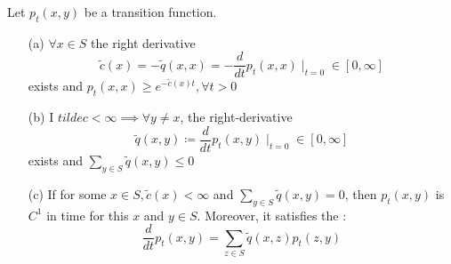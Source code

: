\begin{theorem}\label{thm:1.8}
    Let \(p_t(x,y)\) be a transition function. \begin{enumerate}
        \item[(a)]\(\forall x\in S\) the right derivative \[\tilde{c}(x)=-\tilde{q}(x,x)=-\frac{d}{dt}p_t(x,x)\mid_{t=0}\in[0,\infty]\]
        exists and \(p_t(x,x)\geq e^{-\tilde{c}(x)t},\forall t>0\)
        \item[(b)] I \(tilde{c}<\infty\implies \forall y\neq x\), the right-derivative
            \[\tilde{q}(x,y)\coloneqq \frac{d}{dt}p_t(x,y)\mid_{t=0}\in[0,\infty]\]
            exists and \(\sum_{y\in S}\tilde{q}(x,y)\leq 0\) 
        \item[(c)] If for some  \(x\in S,\tilde{c}(x)<\infty\) and \(\sum_{y\in S} \tilde{q}(x,y)=0\), then \(p_t(x,y)\) is \(C^1\) in time for this \(x\) and \(y\in S\).
            Moreover, it satisfies the : 
            \begin{equation}\label{eq:kolmogorov_backwards}\frac{d}{dt}p_t(x,y)=\sum_{z\in S} \tilde{q}(x,z)p_t(z,y)\end{equation} 
    \end{enumerate}
\end{theorem}

